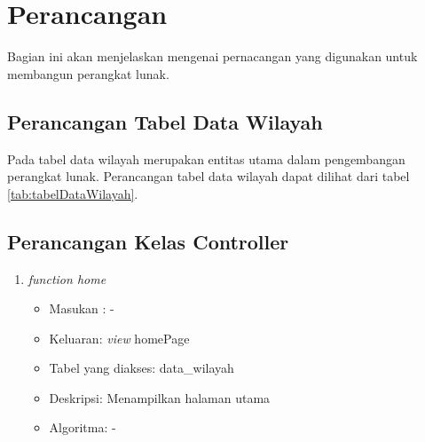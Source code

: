 \chapter{Perancangan}
\label{chap:perancangan}
Bagian ini akan menjelaskan mengenai pernacangan yang digunakan untuk membangun perangkat lunak. 


\section{Perancangan Tabel Data Wilayah}
\label{sec:perancanganTabelDataWilayah}
Pada tabel data wilayah merupakan entitas utama dalam pengembangan perangkat lunak. Perancangan tabel data wilayah dapat dilihat dari tabel \ref{tab:tabelDataWilayah}.
\begin{table}[H]
	\centering
	\caption{Rancangan Tabel Data Willayah}
	\label{tab:tabelDataWilayah}
\end{table}


\section{Perancangan Kelas Controller}
\label{sec:perancanganController}
\begin{enumerate}
	\item \textit{function home}
	\begin{itemize}
		\item Masukan : -
		\item Keluaran: \textit{view} homePage
		\item Tabel yang diakses: data\_wilayah
		\item Deskripsi: Menampilkan halaman utama
		\item Algoritma: -
	\end{itemize}
\end{enumerate}
